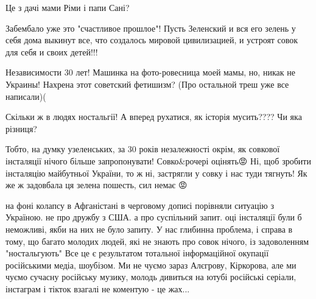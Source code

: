 \begin{itemize}
Це з дачі мами Ріми і папи Сані?

 

Забембало уже это "счастливое прошлое"! Пусть Зеленский и вся его зелень у себя
дома выкинут все, что создалось мировой цивилизацией, и устроят совок для себя
и своих детей!!!


 

Независимости 30 лет! Машинка на фото-ровесница моей мамы, но, никак не
Украины! Нахрена этот советский фетишизм?  (Про остальной треш уже все
написали)(


 

Скільки ж в людях ностальгії! А вперед рухатися, як історія мусить????
Чи яка різниця?

 

Тобто, на думку узеленських, за 30 років незалежності окрім, як совкової
інсталяції нічого більше запропонувати! Совко\&рочері оцінять😡 Ні, щоб зробити
інсталяцію майбутньої України, то ж ні, застрягли у совку і нас туди тягнуть!
Як же ж задовбала ця зелена пошесть, сил немає 😡


 

на фоні колапсу в Афганістані в черговому дописі порівняли ситуацію з Україною.
не про дружбу з США. а про суспільний запит. оці інсталяції були б неможливі,
якби на них не було запиту. У нас глибинна проблема, і справа в тому, що багато
молодих людей, які не знають про совок нічого, із задоволенням "ностальгують"
Все це є результатом тотальної інформаційної окупації російськими медіа,
шоубізом. Ми не чуємо зараз Алєгрову, Кіркорова, але ми чуємо сучасну російську
музику, молодь дивиться на ютубі російські серіали, інстаграм і тікток взагалі
не коментую - це жах...


\end{itemize}
